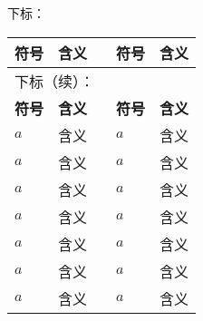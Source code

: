 {\raggedright\heiti{}下标：}

\begin{longtable}{p{2cm} p{4cm} p{1cm} p{2cm} p{4cm}}
	\toprule
	\textbf{符号} & \textbf{含义} && \textbf{符号} &\textbf{含义} \\ 
	\midrule 
	\endfirsthead 
	
	\multicolumn{5}{l}{{\heiti\zihao{5} 下标（续）：}} \\ 
	\toprule
	\textbf{符号} & \textbf{含义} && \textbf{符号} &\textbf{含义} \\ 
	\midrule 
	\endhead 
	
	\bottomrule
	\endfoot
	
	\bottomrule
	\endlastfoot
	
	$a$ & 含义	 &&$a$ & 含义 \\
	$a$ & 含义	 &&$a$ & 含义 \\
	$a$ & 含义	 &&$a$ & 含义 \\
	$a$ & 含义	 &&$a$ & 含义 \\
	$a$ & 含义	 &&$a$ & 含义 \\
	$a$ & 含义 &&$a$ & 含义\\
	$a$ & 含义 &&$a$ & 含义\\
\end{longtable}
